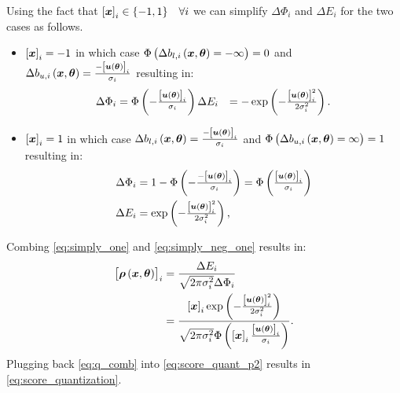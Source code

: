 Using the fact that $\left[{\bm{x}}\right]_i\in \{-1,1\}\quad\forall i$ we can simplify $\Delta\Phi_i$ and $\Delta E_i$ for the two cases as follows.
\begin{itemize}
    \item $\left[{\bm{x}}\right]_i=-1$ in which case {$\Phi\left(\Delta b_{l,i}\left(\bm{x},\bm{\theta}\right)=-\infty\right) =0$} and $\Delta b_{u,i}\left(\bm{x},\bm{\theta}\right)=\frac{-\left[{\bm{u}\left(\bm{\theta}\right)}\right]_i}{\sigma_i}$ resulting in:
    \begin{subequations}\label{eq:simply_one}
    \begin{align}
        \Delta\Phi_i&=\Phi\left(-\tfrac{\left[{\bm{u}\left(\bm{\theta}\right)}\right]_i}{\sigma_i} \right)
        \Delta E_i &=-\exp\left(-\tfrac{\left[{\bm{u}\left(\bm{\theta}\right)}\right]_i^2}{2\sigma_i^2}\right).
    \end{align}
    \end{subequations}
    
    \item $\left[{\bm{x}}\right]_i=1$ in which case $\Delta b_{l,i}\left(\bm{x},\bm{\theta}\right)=\frac{-\left[{\bm{u}\left(\bm{\theta}\right)}\right]_i}{\sigma_i}$ and {$\Phi\left(\Delta b_{u,i}\left(\bm{x},\bm{\theta}\right)=\infty\right)=1$} resulting in:
    \begin{subequations}\label{eq:simply_neg_one}
    \begin{align}
        \Delta\Phi_i&=
        {1} -\Phi\left(-\tfrac{-\left[{\bm{u}\left(\bm{\theta}\right)}\right]_i}{\sigma_i}\right)=\Phi\left(\tfrac{\left[{\bm{u}\left(\bm{\theta}\right)}\right]_i}{\sigma_i} \right) \\
        \Delta E_i &=\exp\left(-\tfrac{\left[{\bm{u}\left(\bm{\theta}\right)}\right]_i^2}{2\sigma_i^2}\right),
    \end{align}
        \end{subequations}
\end{itemize}
Combing \eqref{eq:simply_one} and \eqref{eq:simply_neg_one} results in:
\begin{align}\label{eq:q_comb}
    \left[{\bm{\rho}\left(\bm{x},\bm{\theta}\right)}\right]_i&=\frac{\Delta E_i}{\sqrt{2\pi\sigma^2_i}\Delta\Phi_i}\nonumber\\
                                                           &=\frac{\left[{\bm{x}}\right]_i\exp\left(-\frac{\left[{\bm{u}\left(\bm{\theta}\right)}\right]_i^2}{2\sigma_i^2}\right)}{\sqrt{2\pi\sigma^2_i}\Phi\left(\left[{\bm{x}}\right]_i\frac{\left[{\bm{u}\left(\bm{\theta}\right)}\right]_i}{\sigma_i} \right)}.
\end{align}
Plugging back  \eqref{eq:q_comb}  into \eqref{eq:score_quant_p2} results in \eqref{eq:score_quantization}.